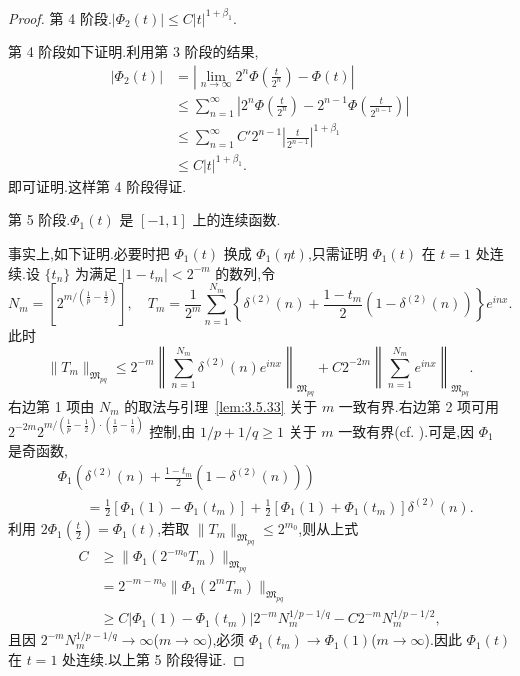\begin{proof}
第 4 阶段.$|\Phi_2(t)|\leq C|t|^{1 + \beta_1}$.

第 4 阶段如下证明.利用第 3 阶段的结果,
\begin{align*}
|\Phi_{2}(t)| &= \left|\lim_{n \to \infty}2^{n}\Phi\left(\frac{t}{2^{n}}\right) - \Phi(t)\right|\\
&\leq \sum_{n=1}^{\infty}\left|2^{n}\Phi\left(\frac{t}{2^{n}}\right) - 2^{n-1}\Phi\left(\frac{t}{2^{n-1}}\right)\right|\\
&\leq \sum_{n=1}^{\infty}C'2^{n-1}\left|\frac{t}{2^{n-1}}\right|^{1+\beta_{1}}\\
&\leq C|t|^{1+\beta_{1}}.
\end{align*}
即可证明.这样第 4 阶段得证.

第 5 阶段.$\Phi_{1}(t)$ 是 $[-1, 1]$ 上的连续函数.

事实上,如下证明.必要时把 $\Phi_{1}(t)$ 换成 $\Phi_{1}(\eta t)$,只需证明 $\Phi_{1}(t)$ 在 $t=1$ 处连续.设 $\{t_{n}\}$ 为满足 $|1-t_{m}|<2^{-m}$ 的数列,令
\begin{equation*}
N_{m} = \left[2^{m/(\frac{1}{p} - \frac{1}{2})}\right], \quad T_{m} = \frac{1}{2^{m}}\sum_{n=1}^{N_{m}}\left\{\delta^{(2)}(n) + \frac{1 - t_{m}}{2}(1 - \delta^{(2)}(n))\right\}e^{inx}.
\end{equation*}
此时
\begin{equation*}
\|T_{m}\|_{\mathfrak{M}_{pq}} \leq 2^{-m}\left\|\sum_{n=1}^{N_{m}}\delta^{(2)}(n)e^{inx}\right\|_{\mathfrak{M}_{pq}} + C2^{-2m}\left\|\sum_{n=1}^{N_{m}}e^{inx}\right\|_{\mathfrak{M}_{pq}}.
\end{equation*}
右边第 1 项由 $N_{m}$ 的取法与引理~\ref{lem:3.5.33} 关于 $m$ 一致有界.右边第 2 项可用 $2^{-2m}2^{m/(\frac{1}{p}-\frac{1}{2})\cdot(\frac{1}{p}-\frac{1}{q})}$ 控制,由 $1/p+1/q\geq1$ 关于 $m$ 一致有界(cf. \cite{ch3:40}).可是,因 $\Phi_{1}$ 是奇函数,
\begin{align*}
&\Phi_{1}\left(\delta^{(2)}(n) + \frac{1 - t_{m}}{2}(1 - \delta^{(2)}(n))\right)\\
&\qquad = \frac{1}{2}\left[\Phi_{1}(1) - \Phi_{1}(t_{m})\right] + \frac{1}{2}\left[\Phi_{1}(1) + \Phi_{1}(t_{m})\right]\delta^{(2)}(n).
\end{align*}
利用 $2\Phi_{1}\left(\frac{t}{2}\right)=\Phi_{1}(t)$,若取 $\|T_{m}\|_{\mathfrak{M}_{pq}}\leq2^{m_{0}}$,则从上式
\begin{align*}
C &\geq \|\Phi_{1}(2^{-m_{0}}T_{m})\|_{\mathfrak{M}_{pq}}\\
&= 2^{-m-m_{0}}\|\Phi_{1}(2^{m}T_{m})\|_{\mathfrak{M}_{pq}}\\
&\geq C|\Phi_{1}(1) - \Phi_{1}(t_{m})|2^{-m}N_{m}^{1/p - 1/q} - C2^{-m}N_{m}^{1/p - 1/2},
\end{align*}
且因 $2^{-m}N_{m}^{1/p-1/q}\to\infty$($m\to\infty$),必须 $\Phi_{1}(t_{m})\to\Phi_{1}(1)$($m\to\infty$).因此 $\Phi_{1}(t)$ 在 $t=1$ 处连续.以上第 5 阶段得证.


\end{proof}

